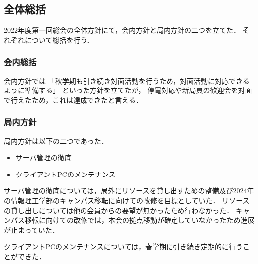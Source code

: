 \subsection*{全体総括}


2022年度第一回総会の全体方針にて，会内方針と局内方針の二つを立てた．
それぞれについて総括を行う．

\subsubsection*{会内総括}
会内方針では
「秋学期も引き続き対面活動を行うため，対面活動に対応できるように準備する」
といった方針を立てたが，
停電対応や新局員の歓迎会を対面で行えたため，これは達成できたと言える．

\subsubsection*{局内方針}

局内方針は以下の二つであった．
\begin{itemize}
    \item サーバ管理の徹底
    \item クライアントPCのメンテナンス
\end{itemize}

サーバ管理の徹底については，局外にリソースを貸し出すための整備及び2024年の情報理工学部のキャンパス移転に向けての改修を目標としていた．
リソースの貸し出しについては他の会員からの要望が無かったため行わなかった．
キャンパス移転に向けての改修では，本会の拠点移動が確定していなかったため進展が止まっていた．

クライアントPCのメンテナンスについては，春学期に引き続き定期的に行うことができた．
